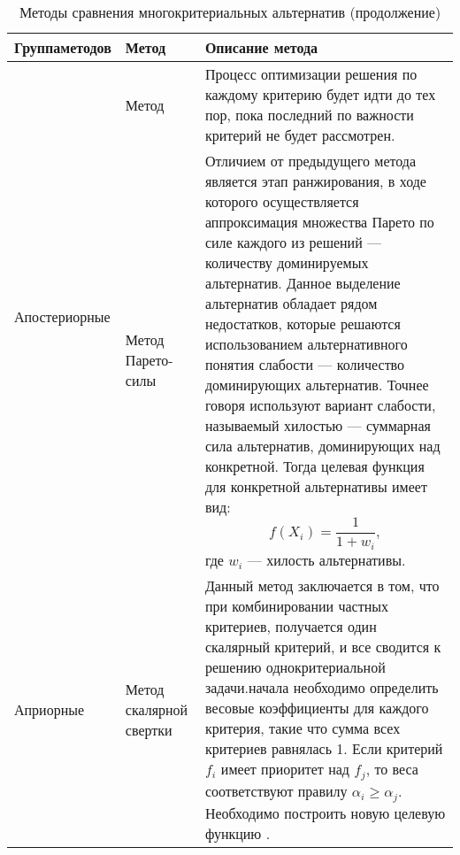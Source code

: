 \begin{table}[H]
	\centering
	\caption{Методы сравнения многокритериальных альтернатив (продолжение)}
	\label{mko_table_1}
	\begin{tabular}{|p{3.3cm}|p{2.4cm}|p{9.5cm}|}
		\hline
		\textbf{Группа\linebreak методов} & \textbf{Метод} & \textbf{Описание метода} \\
		\hline
		\multirow{2}{3.3cm}{Апостериорные} & Метод & Процесс оптимизации решения по каждому критерию будет идти до тех пор, пока последний по важности критерий не будет рассмотрен.\\
		\cline{2-3} & Метод Парето-силы & Отличием от предыдущего метода является этап ранжирования, в ходе которого осуществляется аппроксимация множества Парето по силе \cite{pareto_f} каждого из решений --- количеству доминируемых альтернатив. Данное выделение альтернатив обладает рядом недостатков, которые решаются использованием альтернативного понятия слабости --- количество доминирующих альтернатив. Точнее говоря используют вариант слабости, называемый хилостью --- суммарная сила альтернатив, доминирующих над конкретной. Тогда целевая функция для конкретной альтернативы имеет вид:
		\begin{equation}
			f(X_{i}) = \frac{1}{1 + w_{i}},
		\end{equation}
		где $w_{i}$ --- хилость альтернативы.\\
		\hline
		\multirow{2}{3.3cm}{Априорные} & Метод скалярной свертки & Данный метод заключается в том, что при комбинировании частных критериев,
		получается один скалярный критерий, и все сводится к решению однокритериальной задачи. начала необходимо определить весовые коэффициенты для каждого критерия, такие что сумма всех критериев равнялась 1. Если критерий $f_{i}$ имеет приоритет над $f_{j}$, то веса соответствуют правилу $\alpha_{i} \geq \alpha_{j}$. Необходимо построить новую целевую функцию \cite{upr}.\\
		\hline
	\end{tabular}
\end{table}

